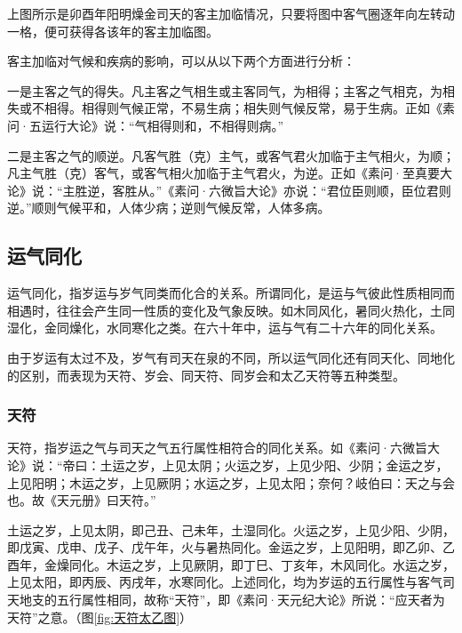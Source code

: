 \documentclass[12pt]{ctexbook}
\begin{document}
上图所示是卯酉年阳明燥金司天的客主加临情况，只要将图中客气圈逐年向左转动一格，便可获得各该年的客主加临图。

客主加临对气候和疾病的影响，可以从以下两个方面进行分析：

一是主客之气的得失。凡主客之气相生或主客同气，为相得；主客之气相克，为相失或不相得。相得则气候正常，不易生病；相失则气候反常，易于生病。正如《素问·五运行大论》说：“气相得则和，不相得则病。”

二是主客之气的顺逆。凡客气胜（克）主气，或客气君火加临于主气相火，为顺；凡主气胜（克）客气，或客气相火加临于主气君火，为逆。正如《素问·至真要大论》说：“主胜逆，客胜从。”《素问·六微旨大论》亦说：“君位臣则顺，臣位君则逆。”顺则气候平和，人体少病；逆则气候反常，人体多病。

\subsection{运气同化}%

运气同化，指岁运与岁气同类而化合的关系。所谓同化，是运与气彼此性质相同而相遇时，往往会产生同一性质的变化及气象反映。如木同风化，暑同火热化，土同湿化，金同燥化，水同寒化之类。在六十年中，运与气有二十六年的同化关系。

由于岁运有太过不及，岁气有司天在泉的不同，所以运气同化还有同天化、同地化的区别，而表现为天符、岁会、同天符、同岁会和太乙天符等五种类型。

\subsubsection{天符}%

天符，指岁运之气与司天之气五行属性相符合的同化关系。如《素问·六微旨大论》说：“帝曰：土运之岁，上见太阴；火运之岁，上见少阳、少阴；金运之岁，上见阳明；木运之岁，上见厥阴；水运之岁，上见太阳；奈何？岐伯曰：天之与会也。故《天元册》曰天符。”

土运之岁，上见太阴，即己丑、己未年，土湿同化。火运之岁，上见少阳、少阴，即戊寅、戊申、戊子、戊午年，火与暑热同化。金运之岁，上见阳明，即乙卯、乙酉年，金燥同化。木运之岁，上见厥阴，即丁巳、丁亥年，木风同化。水运之岁，上见太阳，即丙辰、丙戌年，水寒同化。上述同化，均为岁运的五行属性与客气司天地支的五行属性相同，故称“天符”，即《素问·天元纪大论》所说：“应天者为天符”之意。（图\ref{fig:天符太乙图}）

\end{document}
